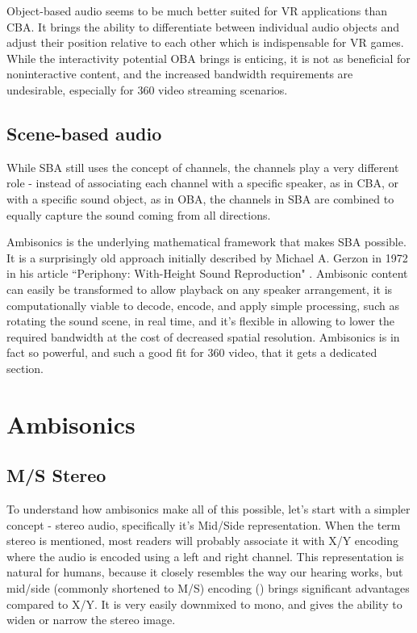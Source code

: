 Object-based audio seems to be much better suited for VR applications than CBA.
It brings the ability to differentiate between individual audio objects 
and adjust their position relative to each other which is indispensable for VR games.
While the interactivity potential OBA brings is enticing, it is not as beneficial for noninteractive content, and
the increased bandwidth requirements are undesirable, especially for 360\degree{} video streaming scenarios.

\subsection{Scene-based audio}

While SBA still uses the concept of channels,
the channels play a very different role - instead of associating each channel with a specific speaker, as in CBA,
or with a specific sound object, as in OBA, the channels in SBA are combined to equally capture 
the sound coming from all directions. \cite{new_realities_in_audio}\cite{sba_using_hoa}\cite{cambridge_imm_audio_review}

Ambisonics is the underlying mathematical framework that makes SBA possible.
It is a surprisingly old approach 
initially described by Michael A. Gerzon in 1972 in his article ``Periphony: With-Height Sound Reproduction" \cite{gerzon1973periphony}.
Ambisonic content can easily be transformed to allow playback on any speaker arrangement, it is computationally viable to decode, encode,
and apply simple processing, such as rotating the sound scene,
in real time, and it's flexible in allowing to lower the required bandwidth at the cost of decreased spatial resolution. \cite{new_realities_in_audio}\cite{qualcomm_sba}
Ambisonics is in fact so powerful, and such a good fit for 360\degree{} video, that it gets a dedicated section.

\section{Ambisonics}

\subsection{M/S Stereo}

To understand how ambisonics make all of this possible, let's start with a simpler concept -
stereo audio, specifically it's Mid/Side representation.
When the term stereo is mentioned, most readers will probably associate it with X/Y encoding where the audio is encoded using a left and right channel.
This representation is natural for humans, because it closely resembles the way our hearing works, 
but mid/side (commonly shortened to M/S) encoding (\cite{ms_herre2004joint}) brings significant advantages compared to X/Y. 
It is very easily downmixed to mono, and gives the ability to widen or narrow the stereo image. \cite{new_realities_in_audio}

